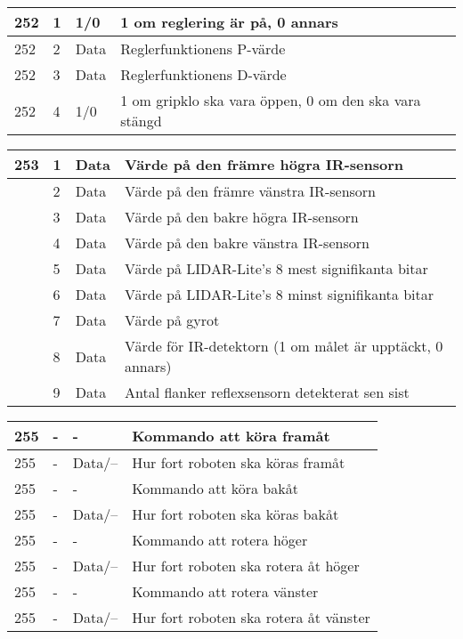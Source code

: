 \documentclass[11pt]{article}
\begin{document}
\begin{flushleft}
\begin{table}[h]
\begin{tabular}{|p{6em}|p{1em}|p{6em}|p{25em}|}
252 & 1 & 1/0 & 1 om reglering är på, 0 annars \\ \hline
252 & 2 & Data & Reglerfunktionens P-värde \\ \hline
252 & 3 & Data & Reglerfunktionens D-värde \\ \hline
252 & 4 & 1/0 & 1 om gripklo ska vara öppen, 0 om den ska vara stängd \\ \hline

\end{tabular}

\begin{tabular}{|p{6em}|p{1em}|p{6em}|p{25em}|} \hline
253\text{*}  & 1 & Data & Värde på den främre högra IR-sensorn \\ \hline
 & 2 & Data & Värde på den främre vänstra IR-sensorn \\ \hline
 & 3 & Data & Värde på den bakre högra IR-sensorn \\ \hline
 & 4 & Data & Värde på den bakre vänstra IR-sensorn \\ \hline

 & 5 & Data &  Värde på LIDAR-Lite's 8 mest signifikanta bitar \\ \hline
 & 6 & Data &  Värde på LIDAR-Lite's 8 minst signifikanta bitar \\ \hline

 & 7 & Data & Värde på gyrot \\ \hline

 & 8 & Data & Värde för IR-detektorn (1 om målet är upptäckt, 0 annars) \\ \hline
  & 9 & Data & Antal flanker reflexsensorn detekterat sen sist\\ \hline
\end{tabular}

\begin{tabular}{|p{6em}|p{1em}|p{6em}|p{25em}|} \hline

255 & - & - & Kommando att köra framåt \\ \hline
255 & - & Data/--\text{**} & Hur fort roboten ska köras framåt \\ \hline
255 & - & - & Kommando att köra bakåt \\ \hline
255 & - & Data/--\text{**}  & Hur fort roboten ska köras bakåt \\ \hline
255 & - & - & Kommando att rotera höger \\ \hline
255 & - & Data/--\text{**}  & Hur fort roboten ska rotera åt höger  \\ \hline
255 & - & - & Kommando att rotera vänster \\ \hline
255 & - & Data/--\text{**} & Hur fort roboten ska rotera åt vänster  \\ \hline



\end{tabular}
\end{table}
\end{flushleft}
\end{document}
